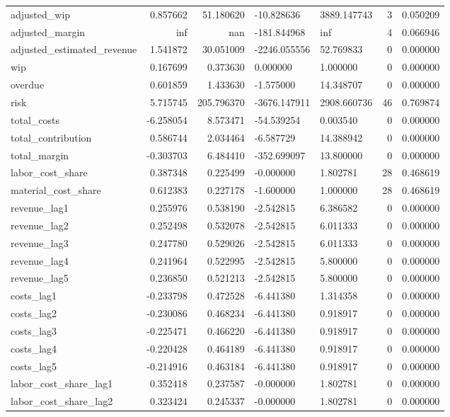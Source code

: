 \begin{landscape}
\begin{longtable}[h!]{lrrllrr}
adjusted_wip & 0.857662 & 51.180620 & -10.828636 & 3889.147743 & 3 & 0.050209 \\
adjusted_margin & inf & nan & -181.844968 & inf & 4 & 0.066946 \\
adjusted_estimated_revenue & 1.541872 & 30.051009 & -2246.055556 & 52.769833 & 0 & 0.000000 \\
wip & 0.167699 & 0.373630 & 0.000000 & 1.000000 & 0 & 0.000000 \\
overdue & 0.601859 & 1.433630 & -1.575000 & 14.348707 & 0 & 0.000000 \\
risk & 5.715745 & 205.796370 & -3676.147911 & 2908.660736 & 46 & 0.769874 \\
total_costs & -6.258054 & 8.573471 & -54.539254 & 0.003540 & 0 & 0.000000 \\
total_contribution & 0.586744 & 2.034464 & -6.587729 & 14.388942 & 0 & 0.000000 \\
total_margin & -0.303703 & 6.484410 & -352.699097 & 13.800000 & 0 & 0.000000 \\
labor_cost_share & 0.387348 & 0.225499 & -0.000000 & 1.802781 & 28 & 0.468619 \\
material_cost_share & 0.612383 & 0.227178 & -1.600000 & 1.000000 & 28 & 0.468619 \\
revenue_lag1 & 0.255976 & 0.538190 & -2.542815 & 6.386582 & 0 & 0.000000 \\
revenue_lag2 & 0.252498 & 0.532078 & -2.542815 & 6.011333 & 0 & 0.000000 \\
revenue_lag3 & 0.247780 & 0.529026 & -2.542815 & 6.011333 & 0 & 0.000000 \\
revenue_lag4 & 0.241964 & 0.522995 & -2.542815 & 5.800000 & 0 & 0.000000 \\
revenue_lag5 & 0.236850 & 0.521213 & -2.542815 & 5.800000 & 0 & 0.000000 \\
costs_lag1 & -0.233798 & 0.472528 & -6.441380 & 1.314358 & 0 & 0.000000 \\
costs_lag2 & -0.230086 & 0.468234 & -6.441380 & 0.918917 & 0 & 0.000000 \\
costs_lag3 & -0.225471 & 0.466220 & -6.441380 & 0.918917 & 0 & 0.000000 \\
costs_lag4 & -0.220428 & 0.464189 & -6.441380 & 0.918917 & 0 & 0.000000 \\
costs_lag5 & -0.214916 & 0.463184 & -6.441380 & 0.918917 & 0 & 0.000000 \\
labor_cost_share_lag1 & 0.352418 & 0.237587 & -0.000000 & 1.802781 & 0 & 0.000000 \\
labor_cost_share_lag2 & 0.323424 & 0.245337 & -0.000000 & 1.802781 & 0 & 0.000000 \\

\end{longtable}
\end{landscape}
